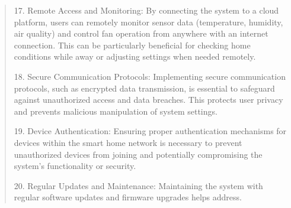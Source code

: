 \documentclass[12pt]{report}
\begin{document}
\begin{quote}
			17. Remote Access and Monitoring:  By connecting the system to a cloud platform, users can remotely monitor sensor data (temperature, humidity, air quality) and control fan operation from anywhere with an internet connection. This can be particularly beneficial for checking home conditions while away or adjusting settings when needed remotely.
			
			18. Secure Communication Protocols: Implementing secure communication protocols, such as encrypted data transmission, is essential to safeguard against unauthorized access and data breaches. This protects user privacy and prevents malicious manipulation of system settings.
			
			19. Device Authentication:  Ensuring proper authentication mechanisms for devices within the smart home network is necessary to prevent unauthorized devices from joining and potentially compromising the system's functionality or security.
			
			20. Regular Updates and Maintenance: Maintaining the system with regular software updates and firmware upgrades helps address.
		
	\end{quote}
	\clearpage
	
\end{document}
